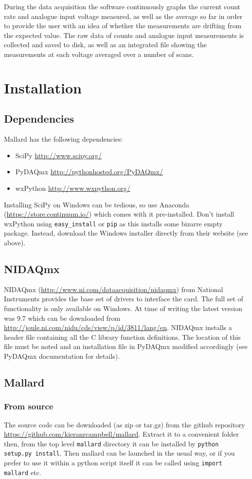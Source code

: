 \documentclass[10pt,a4paper]{article}
\begin{document}
During the data acquisition the software continuously graphs the current count rate and analogue input voltage measured, as well as the average so far in order to provide the user with an idea of whether the measurements are drifting from the expected value. The raw data of counts and analogue input measurements is collected and saved to disk, as well as an integrated file showing the measurements at each voltage averaged over a number of scans.

\section{Installation}
\subsection{Dependencies}
Mallard has the following dependencies:
\begin{itemize}
\item SciPy \url{http://www.scipy.org/}
\item PyDAQmx \url{http://pythonhosted.org/PyDAQmx/}
\item wxPython \url{http://www.wxpython.org/}
\end{itemize}
Installing SciPy on Windows can be tedious, so use Anaconda (\url{https://store.continuum.io/}) which comes with it pre-installed. Don't install wxPython using \texttt{easy\_install} or \texttt{pip} as this installs some bizarre empty package. Instead, download the Windows installer directly from their website (see above).
\subsection{NIDAQmx}
NIDAQmx (\url{http://www.ni.com/dataacquisition/nidaqmx}) from National Instruments provides the base set of drivers to interface the card. The full set of functionality is only available on Windows. At time of writing the latest version was 9.7 which can be downloaded from \url{http://joule.ni.com/nidu/cds/view/p/id/3811/lang/en}. NIDAQmx installs a header file containing all the C library function definitions. The location of this file must be noted and an installation file in PyDAQmx modified accordingly (see PyDAQmx documentation for details).
\subsection{Mallard}
\subsubsection{From source}
The source code can be downloaded (as zip or tar.gz) from the github repository \url{https://github.com/kieranrcampbell/mallard}. Extract it to a convenient folder then, from the top level \texttt{mallard} directory it can be installed by \texttt{python setup.py install}. Then mallard can be launched in the usual way, or if you prefer to use it within a python script itself it can be called using \texttt{import mallard} etc.
\end{document}
